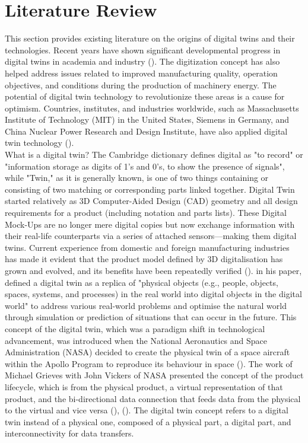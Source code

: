 \section{Literature Review}
This section provides existing literature on the origins of digital twins and their technologies.
Recent years have shown significant developmental progress in digital twins in academia and industry (\cite{wu2020}). The digitization concept has also helped address issues related to improved manufacturing quality, operation objectives, and conditions during the production of machinery energy. The potential of digital twin technology to revolutionize these areas is a cause for optimism. Countries, institutes, and industries worldwide, such as Massachusetts Institute of Technology (MIT) in the United States, Siemens in Germany, and China Nuclear Power Research and Design Institute, have also applied digital twin technology (\cite{mengyan2024digitaltwin}).\\
What is a digital twin? The Cambridge dictionary defines digital as "to record" or "information storage as digits of 1's and 0's, to show the presence of signals", while "Twin," as it is generally known, is one of two things containing or consisting of two matching or corresponding parts linked together. 
Digital Twin started relatively as 3D Computer-Aided Design (CAD) geometry and all design requirements for a product (including notation and parts lists). These Digital Mock-Ups are no longer mere digital copies but now exchange information with their real-life counterparts via a series of attached sensors—making them digital twins. Current experience from domestic and foreign manufacturing industries has made it evident that the product model defined by 3D digitalisation has grown and evolved, and its benefits have been repeatedly verified (\cite{xiong2022}).
\cite{jeong2022} in his paper, defined a digital twin as a replica of "physical objects (e.g., people, objects, spaces, systems, and processes) in the real world into digital objects in the digital world" to address various real-world problems and optimise the natural world through simulation or prediction of situations that can occur in the future. This concept of the digital twin, which was a paradigm shift in technological advancement, was introduced when the National Aeronautics and Space Administration (NASA) decided to create the physical twin of a space aircraft within the Apollo Program to reproduce its behaviour in space (\cite{wang2020digital}). The work of Michael Grieves with John Vickers of NASA presented the concept of the product lifecycle, which is from the physical product, a virtual representation of that product, and the bi-directional data connection that feeds data from the physical to the virtual and vice versa (\cite{jones2020}), (\cite{macias2024}). The digital twin concept refers to a digital twin instead of a physical one, composed of a physical part, a digital part, and interconnectivity for data transfers. 
